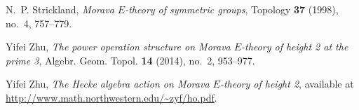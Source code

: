 \documentclass{gtpart}
\theoremstyle{definition}
\theoremstyle{remark}
\renewcommand{\=}{\approx}
\renewcommand{\-}{\sim}
\numberwithin{equation}{section}
\begin{document}
\begin{thebibliography}
N.~P. Strickland, \emph{Morava {$E$}-theory of symmetric groups}, Topology
  \textbf{37} (1998), no.~4, 757--779. 

Yifei Zhu, \emph{The power operation structure on {M}orava {$E$}-theory of
  height 2 at the prime 3}, Algebr. Geom. Topol. \textbf{14} (2014), no.~2,
  953--977. 

Yifei Zhu, \emph{The {H}ecke algebra action on {M}orava {$E$}-theory of height
  2}, available at \href{http://www.math.northwestern.edu/~zyf/ho.pdf}
  {http://www.math.northwestern.edu/\textasciitilde zyf/ho.pdf}.

\end{thebibliography}
\end{document}
